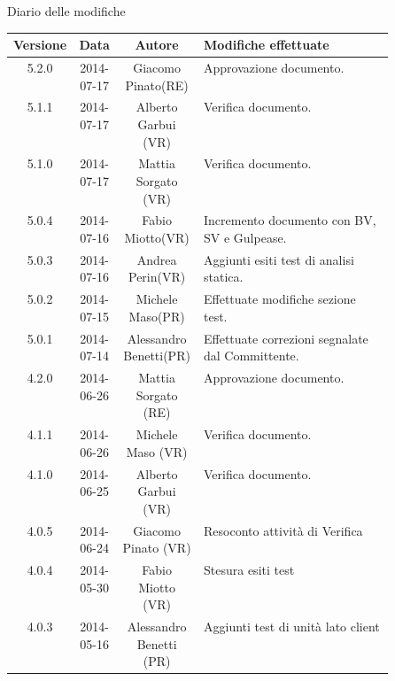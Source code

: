 
\newpage
Diario delle modifiche
\begin{center}
\begin{longtable}{|c|c|c|p{0.5\linewidth}|}
\toprule
\textbf{Versione} & \textbf{Data} & \textbf{Autore} & \textbf{Modifiche effettuate}\\

\midrule
5.2.0 & 2014-07-17 & Giacomo Pinato(RE) & Approvazione documento.\\

\midrule
5.1.1 & 2014-07-17 & Alberto Garbui (VR) & Verifica documento.\\

\midrule
5.1.0 & 2014-07-17 & Mattia Sorgato (VR) & Verifica documento.\\

\midrule
5.0.4 & 2014-07-16 & Fabio Miotto(VR) & Incremento documento con BV, SV e Gulpease.\\

\midrule
5.0.3 & 2014-07-16 & Andrea Perin(VR) & Aggiunti esiti test di analisi statica.\\

\midrule
5.0.2 & 2014-07-15 & Michele Maso(PR) & Effettuate modifiche sezione test.\\

\midrule
5.0.1 & 2014-07-14 & Alessandro Benetti(PR) & Effettuate correzioni segnalate dal Committente.\\

\midrule
4.2.0 & 2014-06-26 & Mattia Sorgato (RE) & Approvazione documento.\\

\midrule
4.1.1 & 2014-06-26 & Michele Maso (VR) & Verifica documento.\\

\midrule
4.1.0 & 2014-06-25 & Alberto Garbui (VR) & Verifica documento.\\

\midrule
4.0.5 & 2014-06-24 & Giacomo Pinato (VR) & Resoconto attività di Verifica\\

\midrule
4.0.4 & 2014-05-30 & Fabio Miotto (VR) & Stesura esiti test\\

\midrule
4.0.3 & 2014-05-16 & Alessandro Benetti (PR) & Aggiunti test di unità lato client\\


\end{longtable}
\end{center}
